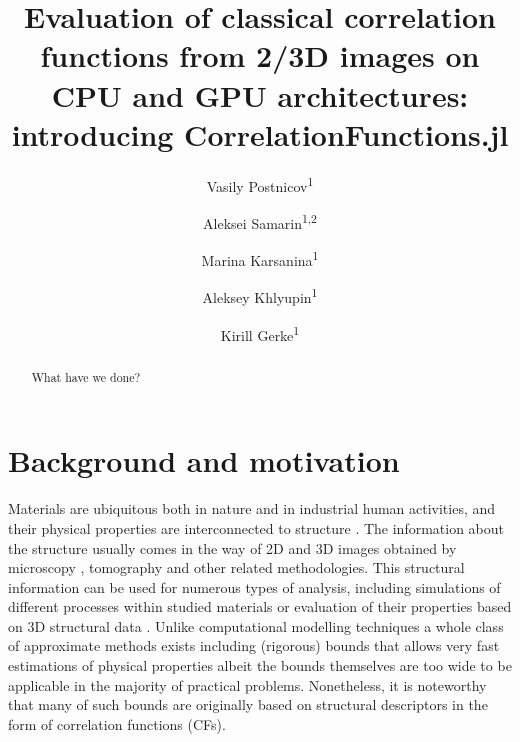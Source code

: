 \documentclass[reprint,amsmath,amssymb,aps,pre,showkeys,showpacs,nofootinbib]{revtex4-1}
\begin{document}

\author{Vasily Postnicov\textsuperscript{1}}
\author{Aleksei Samarin\textsuperscript{1,2}}
\author{Marina Karsanina\textsuperscript{1}}
\author{Aleksey Khlyupin\textsuperscript{1}}
\author{Kirill Gerke\textsuperscript{1}}


\title{Evaluation of classical correlation functions from 2/3D images on CPU and
  GPU architectures: introducing CorrelationFunctions.jl}

\begin{abstract}
  What have we done?
\end{abstract}

\maketitle

\section{Background and motivation}
\label{sec:background}
Materials are ubiquitous both in nature and in industrial human activities, and
their physical properties are interconnected to
structure \cite{Torquato_book,Sahimi_book}. The information
about the structure usually comes in the way of 2D and 3D images obtained by
microscopy \cite{moussaoui2018,neumann2019,FIB-SEMpaper}, tomography \cite{xctmat_book} and other related methodologies.
This structural information can be used for numerous types of analysis, including simulations of
different processes within studied materials or evaluation of their properties
based on 3D structural data \cite{youssef2005,Miao2017,FDMSS}. Unlike computational modelling techniques
a whole class of approximate methods exists including (rigorous) bounds that
allows very fast estimations of physical properties \cite{eshelby1957,berryman1986use,rozanski2023} albeit the bounds themselves
are too wide to be applicable in the majority of practical problems. Nonetheless, it
is noteworthy that many of such bounds are originally based on structural descriptors in
the form of correlation functions (CFs).
\end{document}
